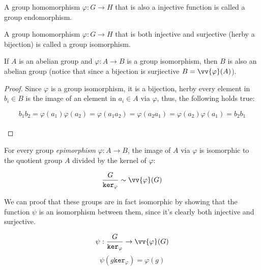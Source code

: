 \begin{definition}
    A group homomorphism $\varphi: G \to H$ that is also a injective 
    function is called a group endomorphism.
\end{definition} \vspace{0.2em}

\begin{definition}
    A group homomorphism $\varphi: G \to H$ that is both injective and surjective 
    (herby a bijection) is called a group isomorphism.
\end{definition} \vspace{0.2em}

\begin{lemma}
\label{lem:abelianityPreservedByIsomorphism}
    If $A$ is an abelian group and $\varphi: A \to B$ is a group isomorphism, 
    then $B$ is also an abelian group (notice that since a bijection is surjiective 
    $B = \vv{\varphi}(A)$).
\end{lemma}
\begin{proof}
    Since $\varphi$ is a group isomorphism, it is a bijection, herby every 
    element in $b_i \in B$ is the image of an element in $a_i \in A$ via $\varphi$, 
    thus, the following holds true:

    $$ b_1b_2 = \varphi(a_1)\varphi(a_2) = \varphi(a_1a_2) = \varphi(a_2a_1) = 
        \varphi(a_2)\varphi(a_1) = b_2b_1 $$ \\

\end{proof} \vspace{0.2em}

\newpage

\begin{theorem}
\label{thm:firstIsomorphism}
    For every group \emph{epimorphism} $\varphi: A \to B$, the image of $A$ via $\varphi$ 
    is isomorphic to the quotient group $A$ divided by the kernel of $\varphi$:

    $$ \frac{G}{\texttt{ker}_{\varphi}} \sim \vv{\varphi}(G) $$ \vspace{0.2em}

    We can proof that these groups are in fact isomorphic by showing that the
    function $\psi$ is an isomorphism between them, since it's clearly both 
    injective and surjective.

    $$ \psi: \frac{G}{\texttt{ker}_{\varphi}} \to \vv{\varphi}(G) $$
    $$ \psi(g\texttt{ker}_{\varphi}) = \varphi(g) $$ \vspace{0.2em}
\end{theorem}

